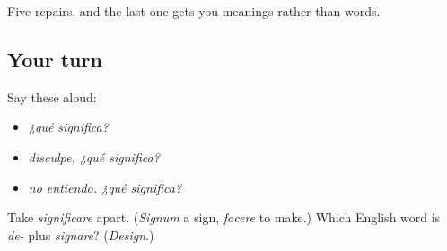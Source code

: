 \begin{grammarlens}[title={What you've built}]
Five repairs, and the last one gets you meanings rather than words.
\end{grammarlens}

\subsection*{Your turn}
Say these aloud:

\begin{itemize}
\raggedright
  \item \emph{¿qué significa?}
  \item \emph{disculpe, ¿qué significa?}
  \item \emph{no entiendo. ¿qué significa?}
\end{itemize}

\begin{tcolorbox}[breakable,colback=teal!4,colframe=teal!35!black,title={Before you move on}]
Take \emph{significare} apart. (\emph{Signum} a sign, \emph{facere} to make.) Which English word is \emph{de-} plus \emph{signare}? (\emph{Design}.)
\end{tcolorbox}
